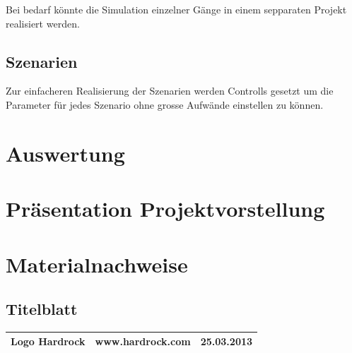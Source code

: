 \documentclass[ngerman,a4paper,12pt]{scrreprt}
\begin{document}
			
			Bei bedarf könnte die Simulation einzelner Gänge in einem sepparaten Projekt realisiert werden.
			
			
			
	\section{Szenarien}
		Zur einfacheren Realisierung der Szenarien werden Controlls gesetzt um die Parameter für jedes Szenario ohne grosse Aufwände einstellen zu können.		
			
			
			
			
			
			

\chapter{Auswertung}



\appendix
\chapter{Präsentation Projektvorstellung}


\listoffigures

\chapter{Materialnachweise}
\section{Titelblatt}
\begin{tabularx}{\textwidth}{|Xlr|}
		\hline
		Logo Hardrock & www.hardrock.com & 25.03.2013 \\
		\hline
\end{tabularx}
\end{document}
